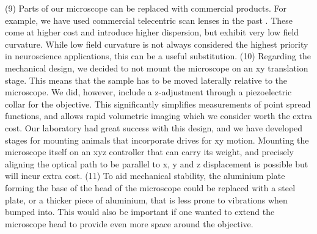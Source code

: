 \documentclass[10pt,letterpaper]{article}
\begin{document}
(9) Parts of our microscope can be replaced with commercial products. For example, we have used commercial telecentric scan lenses in the past \cite{Song2017, Rich2024}. These come at higher cost and introduce higher dispersion, but exhibit very low field curvature. While low field curvature is not always considered the highest priority in neuroscience applications, this can be a useful substitution.\newline
(10) Regarding the mechanical design, we decided to not mount the microscope on an xy translation stage. This means that the sample has to be moved laterally relative to the microscope. We did, however, include a z-adjustment through a piezoelectric collar for the objective. This significantly simplifies measurements of point spread functions, and allows rapid volumetric imaging which we consider worth the extra cost. Our laboratory had great success with this design, and we have developed stages for mounting animals that incorporate drives for xy motion. Mounting the microscope itself on an xyz controller that can carry its weight, and precisely aligning the optical path to be parallel to x, y and z displacement is possible but will incur extra cost.\newline
(11) To aid mechanical stability, the aluminium plate forming the base of the head of the microscope could be replaced with a steel plate, or a thicker piece of aluminium, that is less prone to vibrations when bumped into. This would also be important if one wanted to extend the microscope head to provide even more space around the objective.
\end{document}
